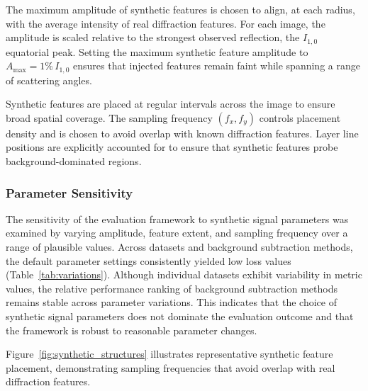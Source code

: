 \documentclass[iucr]{iucrjournals}
\begin{document}
The maximum amplitude of synthetic features is chosen to align, at each radius, with the average intensity of real diffraction features. For each image, the amplitude is scaled relative to the strongest observed reflection, the $I_{1,0}$ equatorial peak. Setting the maximum synthetic feature amplitude to $A_{\mathrm{max}} = 1\%\, I_{1,0}$ ensures that injected features remain faint while spanning a range of scattering angles.

Synthetic features are placed at regular intervals across the image to ensure broad spatial coverage. The sampling frequency $(f_x, f_y)$ controls placement density and is chosen to avoid overlap with known diffraction features. Layer line positions are explicitly accounted for to ensure that synthetic features probe background-dominated regions.


\subsubsection{Parameter Sensitivity}

The sensitivity of the evaluation framework to synthetic signal parameters was examined by varying amplitude, feature extent, and sampling frequency over a range of plausible values. Across datasets and background subtraction methods, the default parameter settings consistently yielded low loss values (Table~\ref{tab:variations}). Although individual datasets exhibit variability in metric values, the relative performance ranking of background subtraction methods remains stable across parameter variations. This indicates that the choice of synthetic signal parameters does not dominate the evaluation outcome and that the framework is robust to reasonable parameter changes.

Figure~\ref{fig:synthetic_structures} illustrates representative synthetic feature placement, demonstrating sampling frequencies that avoid overlap with real diffraction features.
\end{document}
